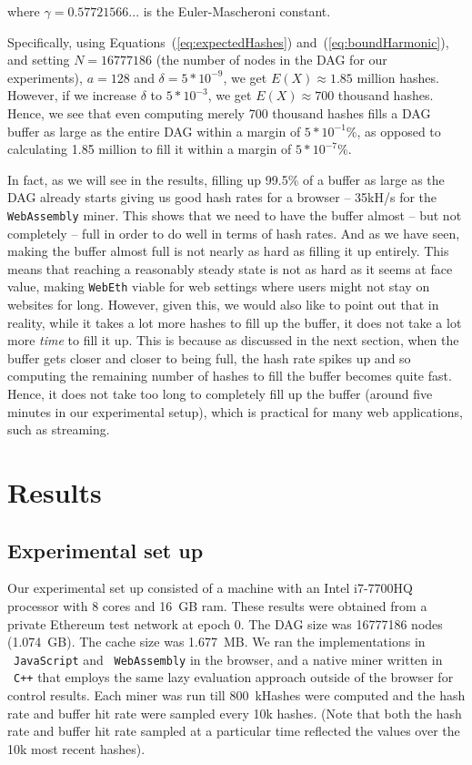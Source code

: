 \documentclass[runningheads]{llncs}
\begin{document}
where $\gamma = 0.57721566...$ is the Euler-Mascheroni constant.

Specifically, using Equations~(\ref{eq:expectedHashes}) and~(\ref{eq:boundHarmonic}), and setting $N = 16777186$ (the number of nodes in the DAG for our experiments), $a = 128$ and $\delta = 5*10^{-9}$, we get $E(X) \approx 1.85$ million hashes. However, if we increase $\delta$ to $5*10^{-3}$, we get $E(X) \approx 700$ thousand hashes. Hence, we see that even computing merely 700 thousand hashes fills a DAG buffer as large as the entire DAG within a margin of $5*10^{-1}\%$, as opposed to calculating 1.85 million to fill it within a margin of $5*10^{-7}\%$. 
 
In fact, as we will see in the results, filling up 99.5\% of a buffer as large as the DAG already starts giving us good hash rates for a browser -- 35kH/s for the \verb|WebAssembly| miner. This shows that we need to have the buffer almost -- but not completely -- full in order to do well in terms of hash rates. And as we have seen, making the buffer almost full is not nearly as hard as filling it up entirely. 
This means that reaching a reasonably steady state is not as hard as it seems at face value, making \verb|WebEth| viable for web settings where users might not stay on websites for long. However, given this, we would also like to point out that in reality, while it takes a lot more hashes to fill up the buffer, it does not take a lot more \emph{time} to fill it up. This is because as discussed in the next section, when the buffer gets closer and closer to being full, the hash rate spikes up and so computing the remaining number of hashes to fill the buffer becomes quite fast. Hence, it does not take too long to completely fill up the buffer (around five minutes in our experimental setup), which is practical for many web applications, such as streaming.

\section{Results}
\label{sec:results}
\subsection{Experimental set up}
Our experimental set up consisted of a machine with an Intel i7-7700HQ processor with 8 cores and 16~GB ram. These results were obtained from a private Ethereum test network at epoch 0. The DAG size was 16777186 nodes (1.074~GB). The cache size was 1.677~MB. We ran the implementations in ~\verb|JavaScript| and ~\verb|WebAssembly| in the browser, and a native miner written in ~\verb|C++| that employs the same lazy evaluation approach outside of the browser for control results. Each miner was run till 800~kHashes were computed and the hash rate and buffer hit rate were sampled every 10k hashes. (Note that both the hash rate and buffer hit rate sampled at a particular time reflected the values over the 10k most recent hashes).
\end{document}
